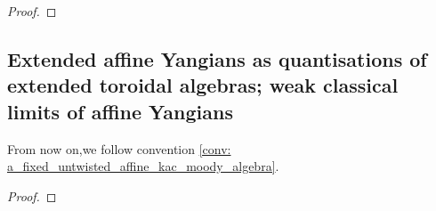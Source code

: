             \begin{theorem} \label{theorem: parametrised_pseudo_coproduct_on_extended_affine_formal_yangians}
                
            \end{theorem}
                \begin{proof}
                    
                \end{proof}

        \subsection{Extended affine Yangians as quantisations of extended toroidal algebras; weak classical limits of affine Yangians}
            From now on,we follow convention \ref{conv: a_fixed_untwisted_affine_kac_moody_algebra}.

            \begin{definition} \label{def: pseudo_quantisation}
                
            \end{definition}
        
            \begin{theorem} \label{theorem: extended_toroidal_lie_algebras_as_classical_limits_of_affine_yangians}
                
            \end{theorem}
                \begin{proof}
                    
                \end{proof}
            
    \printbibliography

